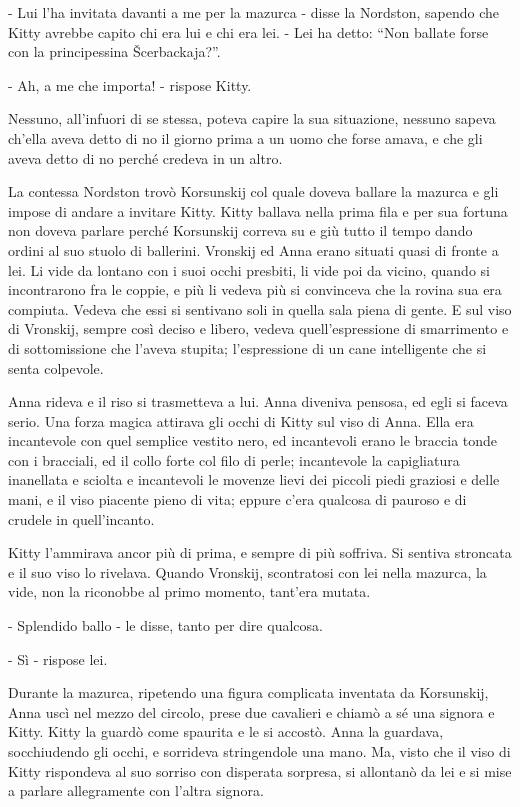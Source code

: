 - Lui l'ha invitata davanti a me per la mazurca - disse la Nordston, sapendo che Kitty avrebbe capito chi era lui e chi era lei. - Lei ha detto: ``Non ballate forse con la principessina Šcerbackaja?''. 

- Ah, a me che importa! - rispose Kitty. 

Nessuno, all'infuori di se stessa, poteva capire la sua situazione, nessuno sapeva ch'ella aveva detto di no il giorno prima a un uomo che forse amava, e che gli aveva detto di no perché credeva in un altro. 

La contessa Nordston trovò Korsunskij col quale doveva ballare la mazurca e gli impose di andare a invitare Kitty. Kitty ballava nella prima fila e per sua fortuna non doveva parlare perché Korsunskij correva su e giù tutto il tempo dando ordini al suo stuolo di ballerini. Vronskij ed Anna erano situati quasi di fronte a lei. Li vide da lontano con i suoi occhi presbiti, li vide poi da vicino, quando si incontrarono fra le coppie, e più li vedeva più si convinceva che la rovina sua era compiuta. Vedeva che essi si sentivano soli in quella sala piena di gente. E sul viso di Vronskij, sempre così deciso e libero, vedeva quell'espressione di smarrimento e di sottomissione che l'aveva stupita; l'espressione di un cane intelligente che si senta colpevole. 

Anna rideva e il riso si trasmetteva a lui. Anna diveniva pensosa, ed egli si faceva serio. Una forza magica attirava gli occhi di Kitty sul viso di Anna. Ella era incantevole con quel semplice vestito nero, ed incantevoli erano le braccia tonde con i bracciali, ed il collo forte col filo di perle; incantevole la capigliatura inanellata e sciolta e incantevoli le movenze lievi dei piccoli piedi graziosi e delle mani, e il viso piacente pieno di vita; eppure c'era qualcosa di pauroso e di crudele in quell'incanto. 

Kitty l'ammirava ancor più di prima, e sempre di più soffriva. Si sentiva stroncata e il suo viso lo rivelava. Quando Vronskij, scontratosi con lei nella mazurca, la vide, non la riconobbe al primo momento, tant'era mutata. 

- Splendido ballo - le disse, tanto per dire qualcosa. 

- Sì - rispose lei. 

Durante la mazurca, ripetendo una figura complicata inventata da Korsunskij, Anna uscì nel mezzo del circolo, prese due cavalieri e chiamò a sé una signora e Kitty. Kitty la guardò come spaurita e le si accostò. Anna la guardava, socchiudendo gli occhi, e sorrideva stringendole una mano. Ma, visto che il viso di Kitty rispondeva al suo sorriso con disperata sorpresa, si allontanò da lei e si mise a parlare allegramente con l'altra signora. 

